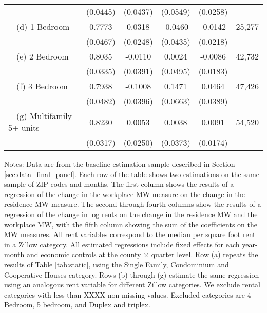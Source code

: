 \begin{landscape}
\begin{table}[ht!]
\begin{tabular}{@{}lccccc@{}}
                                                 & (0.0445) & (0.0437) & (0.0549) & (0.0258) &      \\
        $\quad$(d) 1 Bedroom                     &  0.7773  &  0.0318  &  -0.0460  &  -0.0142  & 25,277 \\
                                                 & (0.0467) & (0.0248) & (0.0435) & (0.0218) &      \\
        $\quad$(e) 2 Bedroom                     &  0.8035  &  -0.0110  &  0.0024  &  -0.0086  & 42,732 \\
                                                 & (0.0335) & (0.0391) & (0.0495) & (0.0183) &      \\
        $\quad$(f) 3 Bedroom                     &  0.7938  &  -0.1008  &  0.1471  &  0.0464  & 47,426 \\
                                                 & (0.0482) & (0.0396) & (0.0663) & (0.0389) &      \\
        $\quad$(g) Multifamily 5+ units          &  0.8230  &  0.0053  &  0.0038  &  0.0091  & 54,520 \\
                                                 & (0.0317) & (0.0250) & (0.0373) & (0.0174) &      \\ \bottomrule
    \end{tabular}

    \begin{minipage}{.95\linewidth} \footnotesize
        \vspace{2mm}
        Notes:
        Data are from the baseline estimation sample described in Section 
        \ref{sec:data_final_panel}.
        Each row of the table shows two estimations on the same sample of ZIP 
        codes and months.
        The first column shows the results of a regression of the change in the 
        workplace MW measure on the change in the residence MW measure.
        The second through fourth columns show the results of a regression of 
        the change in log rents on the change in the residence MW and the 
        workplace MW, with the fifth column showing the sum of the coefficients 
        on the MW measures.
        All rent variables correspond to the median per square foot rent in a 
        Zillow category.
        All estimated regressions include fixed effects for each year-month and 
        economic controls at the county $\times$ quarter level.
        Row (a) repeats the results of Table \ref{tab:static}, using the 
        Single Family, Condominium and Cooperative Houses category.
        Rows (b) through (g) estimate the same regression using an analogous 
        rent variable for different Zillow categories.
        We exclude rental categories with less than XXXX non-missing values.
        Excluded categories are 4 Bedroom, 5 bedroom, and Duplex and triplex.
    \end{minipage}
\end{table}
\end{landscape}
